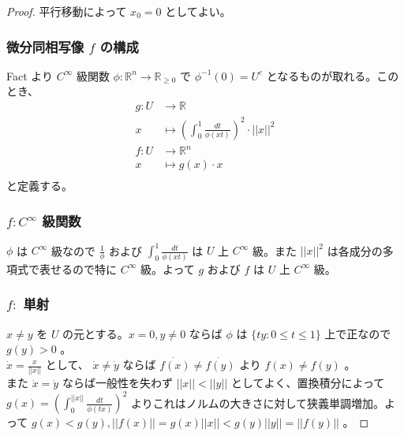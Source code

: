 \documentclass[a4paper,10pt]{jsarticle}
\begin{document}
\begin{proof}
  平行移動によって $x_0=0$ としてよい。

  \subsubsection*{微分同相写像 $f$ の構成}
  Fact より $C^\infty$ 級関数 $\phi:\mathbb{R}^n \to \mathbb{R}_{\geq 0}$ で $\phi^{-1}(0)=U^c$ となるものが取れる。このとき、
  \begin{align*}
    g:U &\to \mathbb{R} \\
    x &\mapsto (\int_{0}^1 \frac{dt}{\phi(xt)})^2 \cdot ||x||^2 \\
    f:U &\to \mathbb{R}^n \\
    x &\mapsto g(x)\cdot x \\
  \end{align*}
  と定義する。 

  \subsubsection*{$f:C^\infty$ 級関数}
  $\phi$ は $C^\infty$ 級なので $\frac{1}{\phi}$ および $\int_{0}^1 \frac{dt}{\phi(xt)}$ は $U$ 上 $C^\infty$ 級。また $||x||^2$ は各成分の多項式で表せるので特に $C^\infty$ 級。よって $g$ および $f$ は $U$ 上 $C^\infty$ 級。
  
  \subsubsection*{$f:$ 単射}
  $x \neq y$ を $U$ の元とする。$x=0,y \neq 0$ ならば $\phi$ は $\{ty:0 \leq t \leq 1\}$ 上で正なので $g(y)>0$ 。 \\
  $\dot{x}=\frac{x}{||x||}$ として、 $\dot{x} \neq \dot{y}$ ならば $\dot{f(x)} \neq \dot{f(y)}$ より $f(x) \neq f(y)$ 。 \\
  また $\dot{x}=\dot{y}$ ならば一般性を失わず $||x||<||y||$ としてよく、置換積分によって $g(x)=(\int_{0}^{||x||} \frac{dt}{\phi(t\dot{x})})^2$ よりこれはノルムの大きさに対して狭義単調増加。よって $g(x)<g(y),||f(x)||=g(x)||x||<g(y)||y||=||f(y)||$ 。
  

\end{proof}
\end{document}
